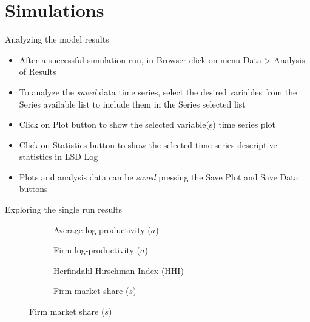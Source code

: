 \documentclass[bigger,aspectratio=169]{beamer}
\begin{document}
\section{Simulations}
\label{sec:org7f0caf2}

\begin{frame}[label={sec:org6bda625}]{Analyzing the model results}
\begin{itemize}
\item After a successful simulation run, in \alert{Browser} click on menu \alert{Data > Analysis of Results}
\item To analyze the \emph{saved} data time series, select the desired variables from the \alert{Series available} list to include them in the \alert{Series selected} list
\item Click on \alert{Plot} button to show the selected variable(s) time series plot
\item Click on \alert{Statistics} button to show the selected time series descriptive statistics in \alert{LSD Log}
\item Plots and analysis data can be \emph{saved} pressing the \alert{Save Plot} and \alert{Save Data} buttons
\end{itemize}
\end{frame}
\begin{frame}[label={sec:org34ff638}]{Exploring the single run results}
\begin{figure}[ht]
    \begin{subfigure}{0.48\textwidth}
        \centering
        
        \caption{Average log-productivity ($a$)}
        \label{fig:avg_prod}
    \end{subfigure}
    \hfill
    \begin{subfigure}{0.48\textwidth}
        \centering
        
        \caption{Firm log-productivity ($a$)}
        \label{fig:firm_prod}
    \end{subfigure}

    \begin{subfigure}{0.48\textwidth}
        \centering
        
        \caption{Herfindahl-Hirschman Index (HHI)}
        \label{fig:hhi}
    \end{subfigure}
    \hfill
    \begin{subfigure}{0.48\textwidth}
        \centering
        
        \caption{Firm market share ($s$)}
        \label{fig:market_share}
    \end{subfigure}
    \label{single-run-industry}
\end{figure}
\end{frame}
\end{document}
